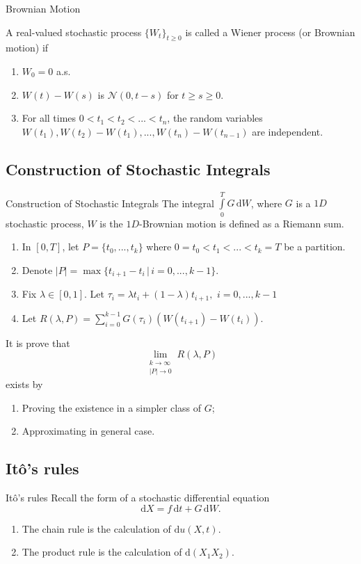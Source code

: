 \begin{frame}{Brownian Motion}
    \begin{definition}
    A real-valued stochastic process $\{W_t\}_{t\ge0}$ is called a Wiener process (or Brownian motion) if
    \begin{enumerate}
        \item $W_0=0$ a.s. 
        \item $W(t)-W(s)$ is $\mathcal{N}(0,t-s)$ for $t\ge s\ge 0.$
        \item For all times $0<t_1<t_2<...<t_n$, the random variables $W(t_1),W(t_2)-W(t_1),...,W(t_n)-W(t_{n-1})$ are independent.
    \end{enumerate}
\end{definition}
\end{frame}

\subsection{Construction of Stochastic Integrals}

\begin{frame}{Construction of Stochastic Integrals}
    The integral $\int\limits_0^T G\,\mathrm{d}W$, where $G$ is a $1D$ stochastic process, $W$ is the $1D$-Brownian motion is defined as a Riemann sum. 
    \begin{enumerate}
        \item In $[0,T]$, let $P=\{t_0,...,t_k\}$ where $0=t_0<t_1<...<t_k=T$ be a partition.
        \item Denote $|P|=\max\{t_{i+1}-t_i\,|\, i=0,...,k-1\}$.
        \item Fix $\lambda\in[0,1]$. Let $\tau_i = \lambda t_{i} + (1-\lambda)t_{i+1},\,\,i=0,...,k-1$
        \item Let $R(\lambda, P)=\sum\limits_{i=0}^{k-1}G(\tau_i)(W(t_{i+1})-W(t_i))$.
    \end{enumerate}
    
    
    It is prove that
    $$\lim_{\substack{k\to\infty\\ |P|\to 0}}R(\lambda, P)$$
    exists by
    \begin{enumerate}
        \item Proving the existence in a simpler class of $G$;
        \item Approximating in general case.
    \end{enumerate}
\end{frame}

\subsection{Itô's rules}
\begin{frame}{Itô's rules}
Recall the form of a stochastic differential equation 
$$\mathrm{d}X = f\,\mathrm{d}t + G\,\mathrm{d}W.$$
\begin{enumerate}
    \item The chain rule is the calculation of $\mathrm{d}u(X,t)$.
    \item The product rule is the calculation of $\mathrm{d}(X_1X_2)$. 
\end{enumerate}
\end{frame}

